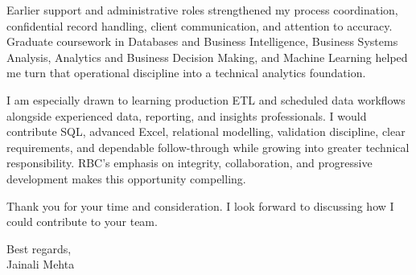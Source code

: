 \documentclass[letterpaper,11pt]{article}
\begin{document}
\bigbreak
Earlier support and administrative roles strengthened my process coordination, confidential record handling, client communication, and attention to accuracy. Graduate coursework in Databases and Business Intelligence, Business Systems Analysis, Analytics and Business Decision Making, and Machine Learning helped me turn that operational discipline into a technical analytics foundation.

\bigbreak
I am especially drawn to learning production ETL and scheduled data workflows alongside experienced data, reporting, and insights professionals. I would contribute SQL, advanced Excel, relational modelling, validation discipline, clear requirements, and dependable follow-through while growing into greater technical responsibility. RBC's emphasis on integrity, collaboration, and progressive development makes this opportunity compelling.

\bigbreak
Thank you for your time and consideration. I look forward to discussing how I could contribute to your team.

\bigbreak
Best regards,\\
Jainali Mehta
\end{document}
